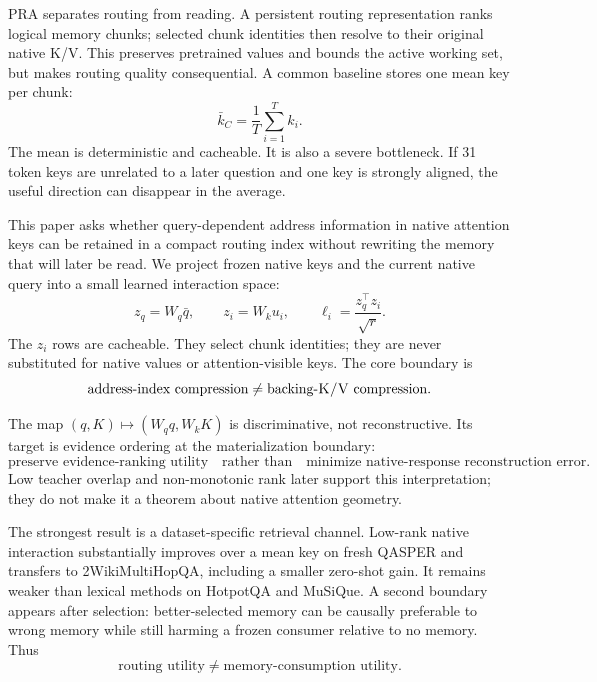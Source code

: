 \documentclass[11pt]{article}
\newcommand{\pra}{\textsc{PRA}\xspace}
\newcommand{\kv}{\textsc{K/V}\xspace}
\newcommand{\hotpot}{HotpotQA\xspace}
\newcommand{\qasper}{QASPER\xspace}
\newcommand{\twowiki}{2WikiMultiHopQA\xspace}
\newcommand{\musique}{MuSiQue\xspace}
\begin{document}
\pra separates routing from reading. A persistent routing representation ranks
logical memory chunks; selected chunk identities then resolve to their original
native \kv. This preserves pretrained values and bounds the active working set,
but makes routing quality consequential. A common baseline stores one mean key
per chunk:
\begin{equation}
  \bar{k}_C=\frac{1}{T}\sum_{i=1}^{T} k_i.
\end{equation}
The mean is deterministic and cacheable. It is also a severe bottleneck. If 31
token keys are unrelated to a later question and one key is strongly aligned,
the useful direction can disappear in the average.

This paper asks whether query-dependent address information in native attention
keys can be retained in a compact routing index without rewriting the memory
that will later be read. We project frozen native keys and the current native
query into a small learned interaction space:
\begin{equation}
  z_q=W_q\bar q,\qquad z_i=W_k u_i,\qquad
  \ell_i=\frac{z_q^\top z_i}{\sqrt r}.
  \label{eq:lowrank}
\end{equation}
The $z_i$ rows are cacheable. They select chunk identities; they are never
substituted for native values or attention-visible keys. The core boundary is
\begin{equation}
  \text{address-index compression}\ne\text{backing-\kv compression}.
  \label{eq:address-boundary}
\end{equation}

The map $(q,K)\mapsto(W_q q,W_k K)$ is discriminative, not reconstructive.
Its target is evidence ordering at the materialization boundary:
\begin{equation}
  \boxed{\text{preserve evidence-ranking utility}}
  \quad\text{rather than}\quad
  \boxed{\text{minimize native-response reconstruction error}}.
  \label{eq:discriminative}
\end{equation}
Low teacher overlap and non-monotonic rank later support this interpretation;
they do not make it a theorem about native attention geometry.

The strongest result is a dataset-specific retrieval channel. Low-rank native
interaction substantially improves over a mean key on fresh \qasper and
transfers to \twowiki, including a smaller zero-shot gain. It remains weaker
than lexical methods on \hotpot and \musique. A second boundary appears after
selection: better-selected memory can be causally preferable to wrong memory
while still harming a frozen consumer relative to no memory. Thus
\begin{equation}
  \text{routing utility}\ne\text{memory-consumption utility}.
  \label{eq:consumption-boundary}
\end{equation}
\end{document}

